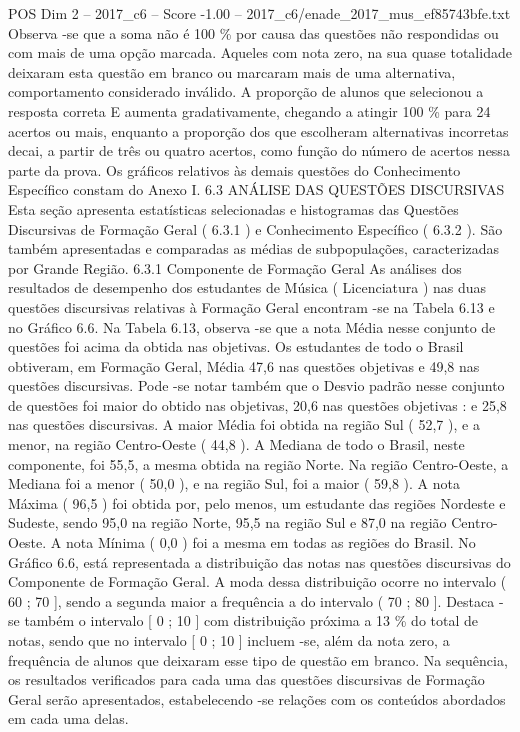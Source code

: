 \begin{textsample}{POS Dim 2 – 2017\_c6 – Score -1.00 – 2017\_c6/enade\_2017\_mus\_ef85743bfe.txt}
Observa -se que a soma não é 100 \% por causa das questões não respondidas ou com mais de uma opção marcada.
Aqueles com nota zero, na sua quase totalidade deixaram esta questão em branco ou marcaram mais de uma alternativa, comportamento considerado inválido.
A proporção de alunos que selecionou a resposta correta E aumenta gradativamente, chegando a atingir 100 \% para 24 acertos ou mais, enquanto a proporção dos que escolheram alternativas incorretas decai, a partir de três ou quatro acertos, como função do número de acertos nessa parte da prova.
Os gráficos relativos às demais questões do Conhecimento Específico constam do Anexo I. 6.3 ANÁLISE DAS QUESTÕES DISCURSIVAS Esta seção apresenta estatísticas selecionadas e histogramas das Questões Discursivas de Formação Geral ( 6.3.1 ) e Conhecimento Específico ( 6.3.2 ).
São também apresentadas e comparadas as médias de subpopulações, caracterizadas por Grande Região. 6.3.1 Componente de Formação Geral As análises dos resultados de desempenho dos estudantes de Música ( Licenciatura ) nas duas questões discursivas relativas à Formação Geral encontram -se na Tabela 6.13 e no Gráfico 6.6.
Na Tabela 6.13, observa -se que a nota Média nesse conjunto de questões foi acima da obtida nas objetivas.
Os estudantes de todo o Brasil obtiveram, em Formação Geral, Média 47,6 nas questões objetivas e 49,8 nas questões discursivas.
Pode -se notar também que o Desvio padrão nesse conjunto de questões foi maior do obtido nas objetivas, 20,6 nas questões objetivas : e 25,8 nas questões discursivas.
A maior Média foi obtida na região Sul ( 52,7 ), e a menor, na região Centro-Oeste ( 44,8 ).
A Mediana de todo o Brasil, neste componente, foi 55,5, a mesma obtida na região Norte.
Na região Centro-Oeste, a Mediana foi a menor ( 50,0 ), e na região Sul, foi a maior ( 59,8 ).
A nota Máxima ( 96,5 ) foi obtida por, pelo menos, um estudante das regiões Nordeste e Sudeste, sendo 95,0 na região Norte, 95,5 na região Sul e 87,0 na região Centro-Oeste.
A nota Mínima ( 0,0 ) foi a mesma em todas as regiões do Brasil.
No Gráfico 6.6, está representada a distribuição das notas nas questões discursivas do Componente de Formação Geral.
A moda dessa distribuição ocorre no intervalo ( 60 ; 70 ], sendo a segunda maior a frequência a do intervalo ( 70 ; 80 ].
Destaca -se também o intervalo [ 0 ; 10 ] com distribuição próxima a 13 \% do total de notas, sendo que no intervalo [ 0 ; 10 ] incluem -se, além da nota zero, a frequência de alunos que deixaram esse tipo de questão em branco.
Na sequência, os resultados verificados para cada uma das questões discursivas de Formação Geral serão apresentados, estabelecendo -se relações com os conteúdos abordados em cada uma delas.

\end{textsample}
